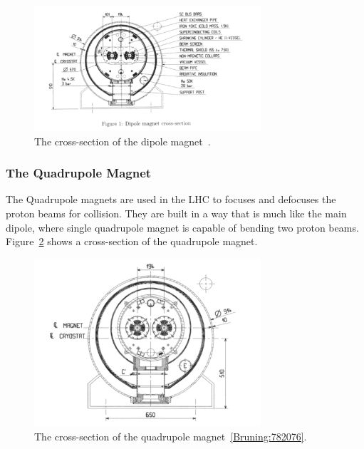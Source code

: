 \begin{figure}[!htb]
    \begin{center}
        \includegraphics[width=0.75\textwidth]{figures/chapter_ATLAS/DipoleMagnets}
        \caption{
        The cross-section of the dipole magnet~\cite{Bruning:782076}.
        }
        \label{fig:dipole}
    \end{center}
\end{figure}

\subsubsection*{The Quadrupole Magnet}
The Quadrupole magnets are used in the LHC to focuses and defocuses the proton beams for collision. They are built in a way that is much like the main dipole, where single quadrupole magnet is capable of bending two proton beams. Figure~\ref{fig:quadrupole} shows a cross-section of the quadrupole magnet. 

\begin{figure}[!htb]
    \begin{center}
        \includegraphics[width=0.75\textwidth]{figures/chapter_ATLAS/QuadrupoleMagnets}
        \caption{
            The cross-section of the quadrupole magnet~\ref{Bruning:782076}.
        }
        \label{fig:quadrupole}
    \end{center}
\end{figure}

